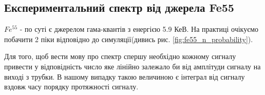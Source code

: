 \documentclass[pdftex,14pt]{scrartcl}
\begin{document}
\begin{spacing}{1.5}
	\subsection{ Експериментальний спектр від джерела Fe55}
		
	
	
	
	
	
	
	
	$Fe^{55}$ - по суті є джерелом гама-квантів з енергією 5.9 КеВ. На практиці  очікуємо побачити 2 піки відповідно до симуляції(дивись рис. \ref{fig:fe55_n_probability}).
	
	Для того, щоб вести мову про спектр спершу необхідно кожному сигналу привести у відповідність число яке лінійно залежало би від амплітуди сигналу на виході з трубки. В нашому випадку такою величиною є інтеграл від сигналу вздовж часу порядку протяжності сигналу.
	

\end{spacing}
\end{document}

